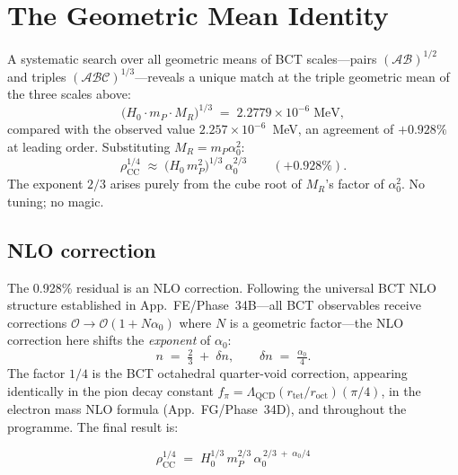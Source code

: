 \documentclass[aps,prl,twocolumn,showpacs,preprintnumbers]{revtex4-2}
\newcommand{\roct}{r_{\mathrm{oct}}}
\newcommand{\rtet}{r_{\mathrm{tet}}}
\newcommand{\azero}{\alpha_0}
\newcommand{\mP}{m_P}
\newcommand{\MR}{M_R}
\newcommand{\rhoCC}{\rho_{\mathrm{CC}}}
\newcommand{\LQCD}{\Lambda_{\mathrm{QCD}}}
\newcommand{\Hzero}{H_0}
\begin{document}
\section{The Geometric Mean Identity}

A systematic search over all geometric means of BCT scales---pairs
$(\mathcal{A}\mathcal{B})^{1/2}$ and triples
$(\mathcal{A}\mathcal{B}\mathcal{C})^{1/3}$---reveals a unique match at the
triple geometric mean of the three scales above:
\begin{equation}
  \bigl(\Hzero\cdot\mP\cdot\MR\bigr)^{1/3}
  \;=\; 2.2779\times10^{-6}\;\text{MeV},
\end{equation}
compared with the observed value $2.257\times10^{-6}$~MeV, an agreement of
$+0.928\%$ at leading order. Substituting $\MR = \mP\azero^2$:
\begin{equation}
  \rhoCC^{1/4} \;\approx\;
  \bigl(\Hzero\,\mP^2\bigr)^{1/3}\,\azero^{2/3}
  \qquad (+0.928\%).
  \label{eq:LO}
\end{equation}
The exponent $2/3$ arises purely from the cube root of $\MR$'s factor
of $\azero^2$. No tuning; no magic.

\subsection*{NLO correction}

The 0.928\% residual is an NLO correction. Following the universal BCT
NLO structure established in App.~FE/Phase~34B---all BCT observables receive
corrections $\mathcal{O} \to \mathcal{O}(1 + N\azero)$ where $N$ is a
geometric factor---the NLO correction here shifts the \emph{exponent} of
$\azero$:
\begin{equation}
  n \;=\; \tfrac{2}{3} \;+\; \delta n,
  \qquad
  \delta n \;=\; \tfrac{\azero}{4}.
  \label{eq:NLO}
\end{equation}
The factor $1/4$ is the BCT octahedral quarter-void correction, appearing
identically in the pion decay constant
$f_\pi = \LQCD(\rtet/\roct)(\pi/4)$, in the electron mass NLO formula
(App.~FG/Phase~34D), and throughout the programme. The final result is:

\begin{equation}
  \boxed{
  \rhoCC^{1/4} \;=\;
  \Hzero^{1/3}\,\mP^{2/3}\,\azero^{\,2/3\;+\;\azero/4}
  }
  \label{eq:main}
\end{equation}
\end{document}
